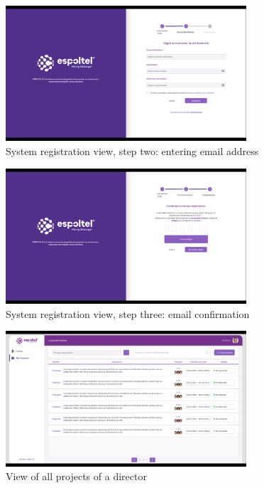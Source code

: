 \documentclass{scrreprt}
\begin{document}
\begin{figure}[H]
	\centering \small
	\includegraphics[width=0.8\textwidth]{WebPrototype/wflow-5.jpeg}
	\caption{System registration view, step two: entering email address}
\end{figure}

\begin{figure}[H]
	\centering \small
	\includegraphics[width=0.8\textwidth]{WebPrototype/wflow-6.jpeg}
	\caption{System registration view, step three: email confirmation }
\end{figure}

\begin{figure}[H]
	\centering \small
	\includegraphics[width=0.8\textwidth]{WebPrototype/wflow-7.jpeg}
	\caption{View of all projects of a director}
\end{figure}
\end{document}
